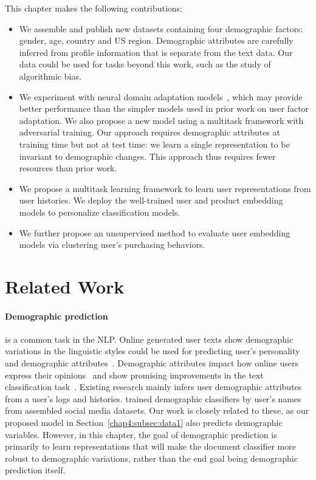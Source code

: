This chapter makes the following contributions:

\begin{itemize}
    \item We assemble and publish new datasets containing four demographic factors: gender, age, country and US region. Demographic attributes are carefully inferred from profile information that is separate from the text data. Our data could be used for tasks beyond this work, such as the study of algorithmic bias.
    \item We experiment with neural domain adaptation models~\cite{ganin2016domain}, which may provide better performance than the simpler models used in prior work on user factor adaptation. We also propose a new model using a multitask framework with adversarial training. Our approach requires demographic attributes at training time but not at test time: we learn a single representation to be invariant to demographic changes. This approach thus requires fewer resources than prior work.
    \item We propose a multitask learning framework to learn user representations from user histories. We deploy the well-trained user and product embedding models to personalize classification models. 
    \item We further propose an unsupervised method to evaluate user embedding models via clustering user's purchasing behaviors.
\end{itemize}


\section{Related Work}

\paragraph{Demographic prediction}
is a common task in the NLP.
Online generated user texts show demographic variations in the linguistic styles could be used for predicting user's personality and demographic attributes~\cite{rosenthal2011age, zhang2016predicting, hovy2018improving, wood2020using, gjurkovic2020pandora, lynn2020hierarchical}. 
Demographic attributes impact how online users express their opinions~\cite{volkova2013exploring, hovy2015demographic, wood2017does} and show promising improvements in the text classification task~\cite{lynn2017human, lynn2019tweet}.
Existing research mainly infers user demographic attributes from a user's logs and histories.
\cite{wood2020using} trained demographic classifiers by user's names from assembled social media datasets.
Our work is closely related to these, as our proposed model in Section~\ref{chap4:subsec:data1} also predicts demographic variables.
However, in this chapter, the goal of demographic prediction is primarily to learn representations that will make the document classifier more robust to demographic variations, rather than the end goal being demographic prediction itself.

